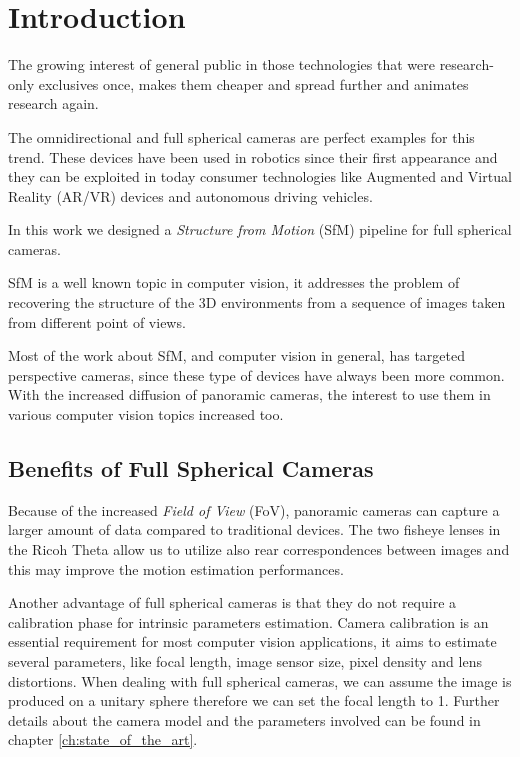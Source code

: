 \chapter{Introduction}
The growing interest of general public in those technologies that were 
research-only exclusives once, makes them cheaper and spread further and
animates research again.

The omnidirectional and full spherical cameras are perfect examples 
for this trend.
These devices have been used in robotics since their first appearance and they 
can be exploited in today consumer technologies like Augmented and Virtual 
Reality (AR/VR) devices and autonomous driving vehicles.

In this work we designed a \textit{Structure from Motion} (SfM) pipeline for 
full spherical cameras.

SfM is a well known topic in computer vision, it addresses the problem of 
recovering the structure of the 3D environments from a sequence of images taken 
from different point of views.

Most of the work about SfM, and computer vision in general, 
has targeted perspective cameras, since these type of devices 
have always been more common.
With the increased diffusion of panoramic cameras, the interest to use them in 
various computer vision topics increased too.

\section{Benefits of Full Spherical Cameras}
Because of the increased \textit{Field of View} (FoV), panoramic cameras can 
capture a larger amount of data compared to traditional devices.
The two fisheye lenses in the Ricoh Theta allow us to utilize also rear 
correspondences between images and this may improve the motion 
estimation performances.

Another advantage of full spherical cameras is that they do not require 
a calibration phase for intrinsic parameters estimation. 
Camera calibration is an essential requirement for most computer vision 
applications,
it aims to estimate several parameters, like focal length, image 
sensor size, pixel density and lens distortions. When dealing with full 
spherical cameras, we can assume the image is produced on a unitary sphere 
therefore we can set the focal length to 1.
Further details about 
the camera model and the parameters involved can be found in 
chapter \ref{ch:state_of_the_art}.

